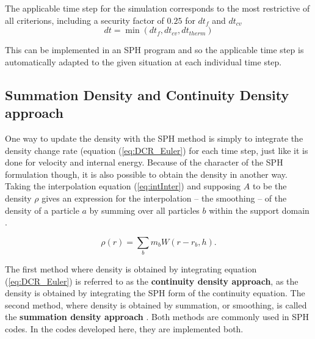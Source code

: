 \documentclass{report}
\begin{document}

The applicable time step for the simulation corresponds to the most restrictive of all criterions, including a security factor of $0.25$ for $dt_f$ and $dt_{cv}$ 
\begin{equation}
\label{eq:dt}
dt=\min(dt_f,dt_{cv},dt_\mathit{therm})
\end{equation}

This can be implemented in an SPH program and so the applicable time step is automatically adapted to the given situation at each individual time step.
 





\subsection{Summation Density and Continuity Density approach}
\label{sec:DensCalcMode}
One way to update the density with the SPH method is simply to integrate the density change rate (equation (\ref{eq:DCR_Euler}) for each time step, just like it is done for velocity and internal energy. Because of the character of the SPH formulation though, it is also possible to obtain the density in another way. Taking the interpolation equation (\ref{eq:intInter}) and supposing $A$ to be the density $\rho$ gives an expression for the interpolation -- the smoothing -- of the density of a particle $a$ by summing over 
all particles $b$ within the support domain \cite{Monaghan2005}.

\begin{equation}
\label{eq:SumDensity}
\rho(r)=\sum_b m_b W(r-r_b,h).
\end{equation}

The first method where density is obtained by integrating equation (\ref{eq:DCR_Euler}) is referred 
to as the {\bf continuity density approach}, as the density is obtained by integrating the SPH form of the continuity equation. The second method, where density is obtained by 
summation, or smoothing, is called the {\bf summation density approach} \cite{Liu2003}. 
Both methods are commonly used in SPH codes. In the codes developed here, they are implemented both.
\end{document}
